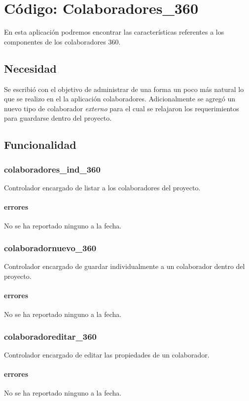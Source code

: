\documentclass[10pt,a4paper]{book}
\begin{document}
	\chapter{Código: Colaboradores\_360}

	En esta aplicación podremos encontrar las características referentes a los componentes de los colaboradores 360.

	\section{Necesidad}

	Se escribió con el objetivo de administrar de una forma un poco más natural lo que se realizo en el la aplicación colaboradores. Adicionalmente se agregó un nuevo tipo de colaborador \textit{externo} para el cual se relajaron los requerimientos para guardarse dentro del proyecto.

	\section{Funcionalidad}


	\subsection{colaboradores\_ind\_360}
	Controlador encargado de listar a los colaboradores del proyecto.
	\subsubsection{errores}
	No se ha reportado ninguno a la fecha.

	\subsection{colaboradornuevo\_360}
	Controlador encargado de guardar individualmente a un colaborador dentro del proyecto.
	\subsubsection{errores}
	No se ha reportado ninguno a la fecha.

	\subsection{colaboradoreditar\_360}
	Controlador encargado de editar las propiedades de un colaborador.
	\subsubsection{errores}
	No se ha reportado ninguno a la fecha.
\end{document}
